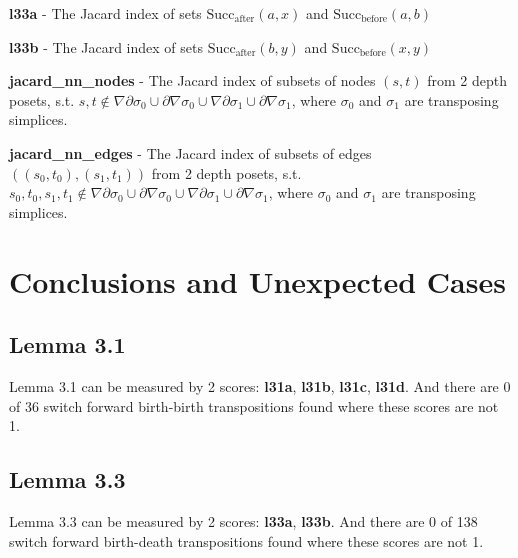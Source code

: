 \documentclass{article}
\begin{document}
\par \textbf{l33a} -
The Jacard index of sets $\text{Succ}_\text{after}(a, x)$ and $\text{Succ}_\text{before}(a, b)$


\par \textbf{l33b} -
The Jacard index of sets $\text{Succ}_\text{after}(b, y)$ and $\text{Succ}_\text{before}(x, y)$


\par \textbf{jacard\_nn\_nodes} -
The Jacard index of subsets of nodes $(s, t)$ from 2 depth posets, s.t.
$s, t \notin \nabla\partial\sigma_0 \cup \partial\nabla\sigma_0 \cup \nabla\partial\sigma_1 \cup \partial\nabla\sigma_1$,
where $\sigma_0$ and $\sigma_1$ are transposing simplices.


\par \textbf{jacard\_nn\_edges} -
The Jacard index of subsets of edges $((s_0, t_0), (s_1, t_1))$ from 2 depth posets, s.t.
$s_0, t_0, s_1, t_1 \notin \nabla\partial\sigma_0 \cup \partial\nabla\sigma_0 \cup \nabla\partial\sigma_1 \cup \partial\nabla\sigma_1$,
where $\sigma_0$ and $\sigma_1$ are transposing simplices.



\section{Conclusions and Unexpected Cases}

\subsection{Lemma 3.1}
\par Lemma 3.1 can be measured by 2 scores: \textbf{l31a}, \textbf{l31b}, \textbf{l31c}, \textbf{l31d}.
And there are 0 of 36 switch forward birth-birth transpositions found where these scores are not 1.

\subsection{Lemma 3.3}
\par Lemma 3.3 can be measured by 2 scores: \textbf{l33a}, \textbf{l33b}.
And there are 0 of 138 switch forward birth-death transpositions found where these scores are not 1.
\end{document}
